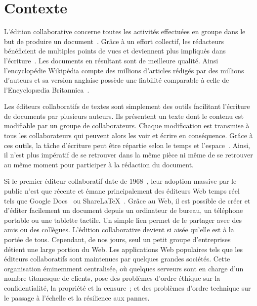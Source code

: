 
\section{Contexte}

\lettrine{L}'édition collaborative concerne toutes les activités effectuées en
groupe dans le but de produire un document~\cite{ellis1989concurrency,
  johansen1988groupware}. Grâce à un effort collectif, les rédacteurs
bénéficient de multiples points de vues et deviennent plus impliqués dans
l'écriture~\cite{noel2004empirical}. Les documents en résultant sont de
meilleure qualité. Ainsi l'encyclopédie Wikipédia compte des millions d'articles
rédigés par des millions d'auteurs et sa version anglaise possède une fiabilité
comparable à celle de l'Encyclopædia Britannica~\cite{giles2005internet}.

Les éditeurs collaboratifs de textes sont simplement des outils facilitant
l'écriture de documents par plusieurs auteurs. Ils présentent un texte dont le
contenu est modifiable par un groupe de collaborateurs. Chaque modification est
transmise à tous les collaborateurs qui peuvent alors les voir et écrire en
conséquence. Grâce à ces outils, la tâche d'écriture peut être répartie selon le
temps et l'espace~\cite{desanctis1987foundation, grudin1994computersupported,
  johansen1988groupware}. Ainsi, il n'est plus impératif de se retrouver dans la
même pièce ni même de se retrouver au même moment pour participer à la rédaction
du document.

Si le premier éditeur collaboratif date de 1968~\cite{engelbart1968research},
leur adoption massive par le public n'est que récente
et émane principalement des éditeurs Web temps réel~\cite{mogan2010impact,
  perkel2014scientific} tels que Google Docs~\cite{googledocs} ou
ShareLaTeX~\cite{sharelatex}. Grâce au Web, il est possible de créer et d'éditer
facilement un document depuis un ordinateur de bureau, un téléphone portable ou
une tablette tactile. Un simple lien permet de le partager avec des amis ou des
collègues. L'édition collaborative devient si aisée qu'elle est à la portée de
tous.  Cependant, de nos jours, seul un petit groupe d'entreprises détient une
large portion du Web. Les applications Web populaires tels que les éditeurs
collaboratifs sont maintenues par quelques grandes sociétés.  %
Cette organisation éminemment centralisée, où quelques serveurs sont en charge
d'un nombre titanesque de clients, pose des problèmes d'ordre éthique sur la
confidentialité, la propriété et la censure~\cite{cherrueau2016composer,
  gellman2013us, pearson2011toward}; et des problèmes d'ordre technique sur le
passage à l'échelle et la résilience aux pannes.

